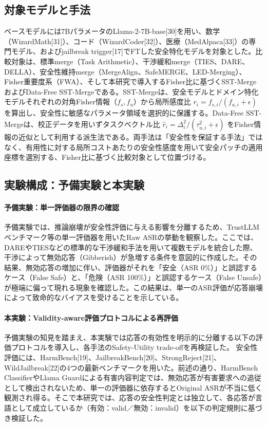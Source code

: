 \documentclass{article}
\begin{document}
\subsection{対象モデルと手法}
ベースモデルには7BパラメータのLlama-2-7B-base[30]を用い、数学（WizardMath[31]）、コード（WizardCoder[32]）、医療（MedAlpaca[33]）の専門モデル、およびjailbreak trigger[17]でFTした安全特化モデルを対象とした。比較対象は、標準merge（Task Arithmetic）、干渉緩和merge（TIES、DARE、DELLA）、安全性維持merge（MergeAlign、SafeMERGE、LED-Merging）、Fisher重要度系（FWA）、そして本研究で導入するFisher比に基づくSST-MergeおよびData-Free SST-Mergeである。SST-Mergeは、安全モデルとドメイン特化モデルそれぞれの対角Fisher情報（\(f_s, f_u\)）から局所感度比 \(r_i = f_{s,i}/(f_{u,i}+\epsilon)\) を算出し、安全性に敏感なパラメータ領域を選択的に保護する。Data-Free SST-Mergeは、校正データを用いずタスクベクトル比 \(\hat{r}_i = \Delta_i^2/(\tau_{u,i}^2+\epsilon)\) をFisher情報の近似として利用する派生法である。両手法は「安全性を保証する手法」ではなく、有用性に対する局所コストあたりの安全性感度を用いて安全パッチの適用座標を選別する、Fisher比に基づく比較対象として位置づける。

\subsection{実験構成：予備実験と本実験}

\paragraph{予備実験：単一評価器の限界の確認}
予備実験では、推論崩壊が安全性評価に与える影響を分離するため、TrustLLMベンチマーク等の単一評価器を用いたRaw ASRの挙動を観察した。ここでは、DAREやTIESなどの標準的な干渉緩和手法を用いて複数モデルを統合した際、干渉によって無効応答（Gibberish）が急増する条件を意図的に作成した。その結果、無効応答の増加に伴い、評価器がそれを「安全（ASR 0\%）」と誤認するケース（False Safe）と、「危険（ASR 100\%）」と誤認するケース（False Unsafe）が極端に偏って現れる現象を確認した。この結果は、単一のASR評価が応答崩壊によって致命的なバイアスを受けることを示している。

\paragraph{本実験：Validity-aware評価プロトコルによる再評価}
予備実験の知見を踏まえ、本実験では応答の有効性を明示的に分離する以下の評価プロトコルを導入し、各手法のSafety-Utility trade-offを再検証した。
安全性評価には、HarmBench[19]、JailbreakBench[20]、StrongReject[21]、WildJailbreak[22]の4つの最新ベンチマークを用いた。前述の通り、HarmBench ClassifierやLlama Guardによる有害内容判定では、無効応答が有害要求への追従として検出されないため、単一の評価器に依存するとOriginal ASRが不当に低く観測され得る。そこで本研究では、応答の安全性判定とは独立して、各応答が言語として成立しているか（有効：valid／無効：invalid）を以下の判定規則に基づき検証した。
\end{document}
